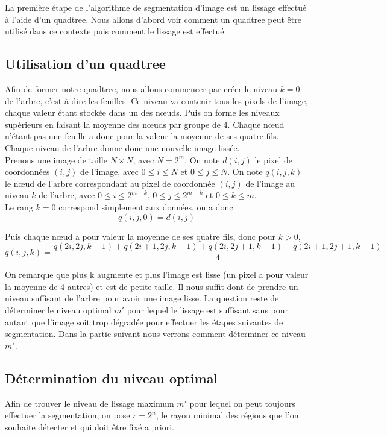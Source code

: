 La première étape de l'algorithme de segmentation d'image est un lissage effectué à l'aide d'un quadtree. Nous allons d'abord voir comment un quadtree peut être utilisé dans ce contexte puis comment le lissage est effectué.

\subsection{Utilisation d'un quadtree}
	Afin de former notre quadtree, nous allons commencer par créer le niveau $k = 0$ de l'arbre, c'est-à-dire les feuilles. Ce niveau va contenir tous les pixels de l'image, chaque valeur étant stockée dans un des nœuds. Puis on forme les niveaux supérieurs en faisant la moyenne des nœuds par groupe de 4. Chaque nœud n'étant pas une feuille a donc pour la valeur la moyenne de ses quatre fils. Chaque niveau de l'arbre donne donc une nouvelle image lissée.\\

	Prenons une image de taille $N \times N$, avec $N = 2^m$. On note $d(i,j)$ le pixel de coordonnées $(i,j)$ de l'image, avec  $0 \leq i \leq N$ et $0 \leq j \leq N$. On note $q(i,j,k)$ le nœud de l'arbre correspondant au pixel de coordonnée $(i,j)$ de l'image au niveau $k$ de l'arbre, avec $0 \leq i \leq 2^{m-k}$, $0 \leq j \leq 2^{m-k}$ et $0 \leq k \leq m$.\\

	Le rang $k = 0$ correspond simplement aux données, on a donc \[q(i,j,0) = d(i,j)\]

	Puis chaque nœud a pour valeur la moyenne de ses quatre fils, donc pour $k > 0$,
	\[ q(i,j,k) = \frac{q(2i, 2j, k-1) + q(2i+1, 2j, k-1) + q(2i, 2j+1, k-1) + q(2i+1, 2j+1, k-1)}{4}\]


	On remarque que plus k augmente et plus l'image est lisse (un pixel a pour valeur la moyenne de 4 autres) et est de petite taille. Il nous suffit dont de prendre un niveau suffisant de l'arbre pour avoir une image lisse. La question reste de déterminer le niveau optimal $m'$ pour lequel le lissage est suffisant sans pour autant que l'image soit trop dégradée pour effectuer les étapes suivantes de segmentation. Dans la partie suivant nous verrons comment déterminer ce niveau $m'$.

\subsection{Détermination du niveau optimal}
	Afin de trouver le niveau de lissage maximum $m'$ pour lequel on peut toujours effectuer la segmentation, on pose $r = 2^n$, le rayon minimal des régions que l'on souhaite détecter et qui doit être fixé a priori.


